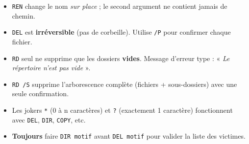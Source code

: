 \documentclass[11pt]{article}
\begin{document}
\begin{aretenir}
\begin{itemize}
    \item \texttt{REN} change le nom \emph{sur place} ; le second argument ne contient jamais de chemin.
    \item \texttt{DEL} est \textbf{irréversible} (pas de corbeille). Utilise \texttt{/P} pour confirmer chaque fichier.
    \item \texttt{RD} seul ne supprime que les dossiers \textbf{vides}. Message d'erreur type : « \emph{Le répertoire n'est pas vide} ».
    \item \texttt{RD /S} supprime l'arborescence complète (fichiers + sous-dossiers) avec une seule confirmation.
    \item Les jokers \texttt{*} (0 à n caractères) et \texttt{?} (exactement 1 caractère) fonctionnent avec \texttt{DEL}, \texttt{DIR}, \texttt{COPY}, etc.
    \item \textbf{Toujours} faire \texttt{DIR motif} avant \texttt{DEL motif} pour valider la liste des victimes.
\end{itemize}
\end{aretenir}
\end{document}
